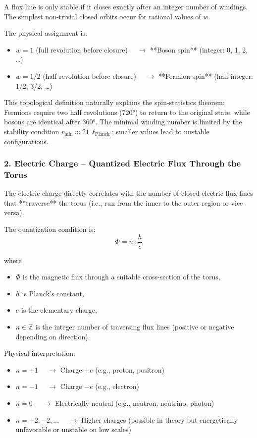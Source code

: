 A flux line is only stable if it closes exactly after an integer number of windings. The simplest non-trivial closed orbits occur for rational values of $w$.

The physical assignment is:
\begin{itemize}
	\item $w = 1$ \quad (full revolution before closure) $\quad \to$ **Boson spin** (integer: 0, 1, 2, …)
	\item $w = 1/2$ \quad (half revolution before closure) $\quad \to$ **Fermion spin** (half-integer: 1/2, 3/2, …)
\end{itemize}

This topological definition naturally explains the spin-statistics theorem: Fermions require two half revolutions (720°) to return to the original state, while bosons are identical after 360°. The minimal winding number is limited by the stability condition $r_{\min} \approx 21 \, \ell_{\text{Planck}}$; smaller values lead to unstable configurations.

\subsubsection{2. Electric Charge – Quantized Electric Flux Through the Torus}

The electric charge directly correlates with the number of closed electric flux lines that **traverse** the torus (i.e., run from the inner to the outer region or vice versa).

The quantization condition is:
\begin{equation}
	\Phi = n \cdot \frac{h}{e}
	\label{eq:flux_quantization}
\end{equation}

where
\begin{itemize}
	\item $\Phi$ is the magnetic flux through a suitable cross-section of the torus,
	\item $h$ is Planck's constant,
	\item $e$ is the elementary charge,
	\item $n \in \mathbb{Z}$ is the integer number of traversing flux lines (positive or negative depending on direction).
\end{itemize}

Physical interpretation:
\begin{itemize}
	\item $n = +1$ $\quad \to$ Charge $+e$ \quad (e.g., proton, positron)
	\item $n = -1$ $\quad \to$ Charge $-e$ \quad (e.g., electron)
	\item $n = 0$   $\quad \to$ Electrically neutral \quad (e.g., neutron, neutrino, photon)
	\item $n = +2, -2, \dots$ $\quad \to$ Higher charges (possible in theory but energetically unfavorable or unstable on low scales)
\end{itemize}

